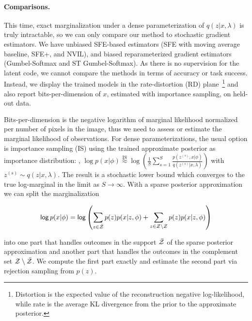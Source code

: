 \begin{sloppypar}
    \paragraph*{Comparisons.} This time, exact marginalization under a
    dense parameterization of $q (z | x, \lambda)$ is truly intractable,
    so we can only compare our method to stochastic gradient estimators.
    We have unbiased SFE-based estimators (SFE with moving average
    baseline, SFE+, and NVIL), and biased reparameterized gradient
    estimators (Gumbel-Softmax and ST Gumbel-Softmax). As there is no
    supervision for the latent code, we cannot compare the methods in
    terms of accuracy or task success. Instead, we display the trained
    models in the rate-distortion (RD)
    plane~\citep{Alemi2018}\footnote{Distortion is the expected value of
        the reconstruction negative log-likelihood, while rate is the average
        KL divergence from the prior to the approximate posterior.} and also
    report bits-per-dimension of $x$, estimated with importance sampling,
    on held-out data.
\end{sloppypar}

\begin{sloppypar}
    Bits-per-dimension is the negative logarithm of marginal likelihood
    normalized per number of pixels in the image, thus we need to assess
    or estimate the marginal likelihood of observations. For dense
    parameterizations, the usual option is importance sampling (IS) using
    the trained approximate posterior as importance distribution: \ie,
    $\log p(x|\phi) \overset{\text{IS}}{\approx} \log \left(\frac{1}{S}
        \sum_{s=1}^S \frac{p(z^{(s)}, x|\phi)}{q(z^{(s)} | x, \lambda)}
        \right)$ with $z^{(s)} \sim q(z|x, \lambda)$. The result is a
    stochastic lower bound which converges to the true log-marginal in
    the limit as $S \to \infty$. With a sparse posterior approximation we
    can split the marginalization
\end{sloppypar}

\begin{equation}
    \operatorname*{\mathsf{log}} p(x|\phi) = \operatorname*{\mathsf{log}} \left( \sum_{z \in \bar {\mathcal{Z}}}
    p(z)p(x|z, \phi) + \sum_{z \in \mathcal{Z} \setminus \mathcal{Z}} p(z)p(x|z, \phi)
    \right)
\end{equation}

into one part that handles outcomes in the support $\bar {\mathcal{Z}}$ of the
sparse posterior approximation and another part that handles the
outcomes in the complement set $\mathcal{Z} \setminus \bar {\mathcal{Z}}$. We compute
the first part exactly and estimate the second part via rejection
sampling from $p(z)$.

